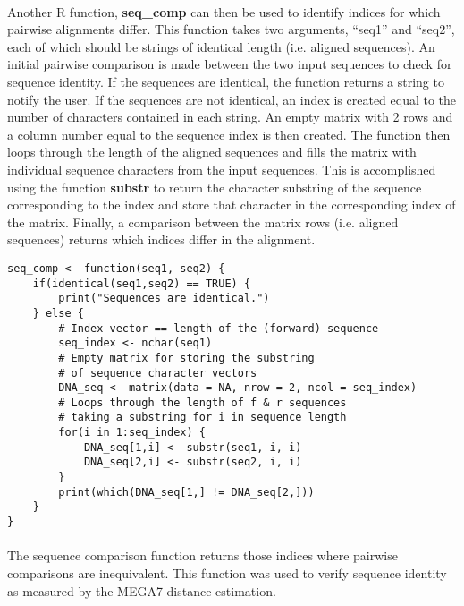 \paragraph{} Another R function, \textbf{seq\_comp} can then be used to identify indices for which pairwise alignments differ.  This function takes two arguments, “seq1” and “seq2”, each of which should be strings of identical length (i.e. aligned sequences).  An initial pairwise comparison is made between the two input sequences to check for sequence identity.  If the sequences are identical, the function returns a string to notify the user.  If the sequences are not identical, an index is created equal to the number of characters contained in each string.  An empty matrix with 2 rows and a column number equal to the sequence index is then created.  The function then loops through the length of the aligned sequences and fills the matrix with individual sequence characters from the input sequences.  This is accomplished using the function \textbf{substr} to return the character substring of the sequence corresponding to the index and store that character in the corresponding index of the matrix.  Finally, a comparison between the matrix rows (i.e. aligned sequences) returns which indices differ in the alignment.  

\vspace*{30pt}

\begin{lstlisting}[caption={Contents of the \textbf{seq\_comp} function}]
seq_comp <- function(seq1, seq2) {
    if(identical(seq1,seq2) == TRUE) {
        print("Sequences are identical.")
    } else {
        # Index vector == length of the (forward) sequence
        seq_index <- nchar(seq1)
        # Empty matrix for storing the substring
        # of sequence character vectors
        DNA_seq <- matrix(data = NA, nrow = 2, ncol = seq_index)
        # Loops through the length of f & r sequences
        # taking a substring for i in sequence length
        for(i in 1:seq_index) {
            DNA_seq[1,i] <- substr(seq1, i, i)
            DNA_seq[2,i] <- substr(seq2, i, i)
        }
        print(which(DNA_seq[1,] != DNA_seq[2,]))
    }
}
\end{lstlisting}

\clearpage

\paragraph{} The sequence comparison function returns those indices where pairwise comparisons are inequivalent.  This function was used to verify sequence identity as measured by the MEGA7 distance estimation.   

